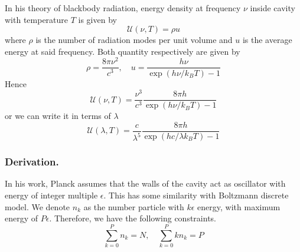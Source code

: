 \documentclass[../../../Main.tex]{subfiles}
\begin{document}
In his theory of blackbody radiation, energy density at frequency $\nu$ inside cavity with temperature $T$ is given by
\begin{equation*}
    \mathcal{U}(\nu,T)=\rho u
\end{equation*}
where $\rho$ is the number of radiation modes per unit volume and $u$ is the average energy at said frequency. Both quantity respectively are given by 
\begin{equation*}
    \rho=\frac{8\pi\nu^2}{c^3},\quad u=\frac{h\nu}{\exp(h\nu/k_BT)-1}
\end{equation*}
Hence
\begin{equation*}
    \mathcal{U}(\nu,T)=\frac{\nu^3}{c^3}\frac{8\pi h}{\exp(h\nu/k_BT)-1}
\end{equation*}
or we can write it in terms of $\lambda$
\begin{equation*}
    \mathcal{U}(\lambda,T)=\frac{c}{\lambda^5}\frac{8\pi h}{\exp(hc/\lambda k_BT)-1}
\end{equation*}
\subsubsection*{Derivation.} In his work, Planck assumes that the walls of the cavity act as oscillator with  energy of integer multiple $\epsilon$. This has some similarity with Boltzmann discrete model. We denote $n_k$ as the number particle with $k\epsilon$ energy, with maximum energy of $P\epsilon$. Therefore, we have the following constraints.
\begin{equation*}
    \sum_{k=0}^{P}n_k=N,\quad\sum_{k=0}^{P}kn_k=P
\end{equation*}
\end{document}

